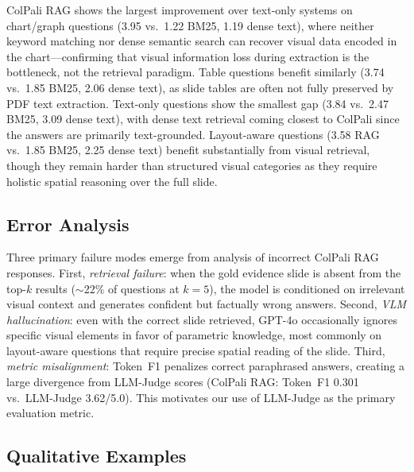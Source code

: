 \documentclass{article} %
\begin{document}
ColPali RAG shows the largest improvement over text-only systems on chart/graph questions (3.95 vs.\ 1.22 BM25, 1.19 dense text), where neither keyword matching nor dense semantic search can recover visual data encoded in the chart---confirming that visual information loss during extraction is the bottleneck, not the retrieval paradigm. Table questions benefit similarly (3.74 vs.\ 1.85 BM25, 2.06 dense text), as slide tables are often not fully preserved by PDF text extraction. Text-only questions show the smallest gap (3.84 vs.\ 2.47 BM25, 3.09 dense text), with dense text retrieval coming closest to ColPali since the answers are primarily text-grounded. Layout-aware questions (3.58 RAG vs.\ 1.85 BM25, 2.25 dense text) benefit substantially from visual retrieval, though they remain harder than structured visual categories as they require holistic spatial reasoning over the full slide.

\subsection{Error Analysis}

Three primary failure modes emerge from analysis of incorrect ColPali RAG responses. First, \emph{retrieval failure}: when the gold evidence slide is absent from the top-$k$ results ($\sim$22\% of questions at $k{=}5$), the model is conditioned on irrelevant visual context and generates confident but factually wrong answers. Second, \emph{VLM hallucination}: even with the correct slide retrieved, GPT-4o occasionally ignores specific visual elements in favor of parametric knowledge, most commonly on layout-aware questions that require precise spatial reading of the slide. Third, \emph{metric misalignment}: Token~F1 penalizes correct paraphrased answers, creating a large divergence from LLM-Judge scores (ColPali RAG: Token~F1 0.301 vs.\ LLM-Judge 3.62/5.0). This motivates our use of LLM-Judge as the primary evaluation metric.

\subsection{Qualitative Examples}
\label{sec:qualitative}
\end{document}

